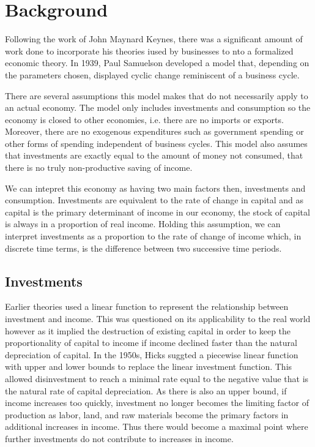 \documentclass[]{article}
\begin{document}
	\section*{Background}
  Following the work of John Maynard Keynes, there was a significant amount of work done to incorporate his theories iused by businesses to nto a formalized economic theory. In 1939, Paul Samuelson developed a model that, depending on the parameters chosen, displayed cyclic change reminiscent of a business cycle\autocite{Puu2003,Skousen1997}.

	There are several assumptions this model makes that do not necessarily apply to an actual economy. The model only includes investments and consumption so the economy is closed to other economies, i.e. there are no imports or exports. Moreover, there are no exogenous expenditures such as government spending or other forms of spending independent of business cycles. This model also assumes that investments are exactly equal to the amount of money not consumed, that there is no truly non-productive saving of income.

	We can intepret this economy as having two main factors then, investments and consumption. Investments are equivalent to the rate of change in capital and as capital is the primary determinant of income in our economy, the stock of capital is always in a proportion of real income. Holding this assumption, we can interpret investments as a proportion to the rate of change of income which, in discrete time terms, is the difference between two successive time periods.

	\subsection*{Investments}
	Earlier theories used a linear function to represent the relationship between investment and income. This was questioned on its applicability to the real world however as it implied the destruction of existing capital in order to keep the proportionality of capital to income if income declined faster than the natural depreciation of capital. In the 1950s, Hicks suggted a piecewise linear function with upper and lower bounds to replace the linear investment function\autocite{Puu2003}. This allowed disinvestment to reach a minimal rate equal to the negative value that is the natural rate of capital depreciation. As there is also an upper bound, if income increases too quickly, investment no longer becomes the limiting factor of production as labor, land, and raw materials become the primary factors in additional increases in income. Thus there would become a maximal point where further investments do not contribute to increases in income.
\end{document}
